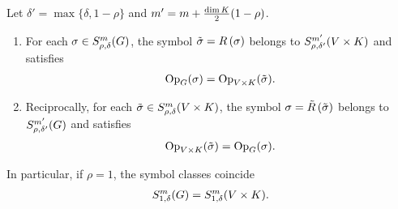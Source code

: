 \begin{theorem}
    Let $\delta' = \max \{\delta, 1 - \rho\}$ and $m' = m + \frac {\dim \CompactGroup} 2 (1 - \rho)$.

    \begin{enumerate}
        \item
            For each $\sigma \in \SymbolClass m {\rho, \delta}$,
            the symbol $\tilde \sigma = \InverseRotation \sigma$ belongs to $\SymbolClass [\GroupDirect] {m'} {\rho, \delta'}$
            and satisfies
            \begin{align*}
                \Op[\Group] (\sigma) = \Op[\GroupDirect] (\tilde \sigma).
            \end{align*}
        \item
            Reciprocally, for each $\tilde \sigma \in \SymbolClass [\GroupDirect] m {\rho, \delta}$,
            the symbol $\sigma = \Rotation {\tilde \sigma}$ belongs to $\SymbolClass {m'} {\rho, \delta'}$
            and satisfies
            \begin{align*}
                \Op[\GroupDirect] (\tilde \sigma) = \Op[\Group] (\sigma).
            \end{align*}
    \end{enumerate}

    In particular, if $\rho = 1$, the symbol classes coincide
    \begin{align*}
        \SymbolClass m {1, \delta} = \SymbolClass [\GroupDirect] m {1, \delta}.
    \end{align*}
\end{theorem}
